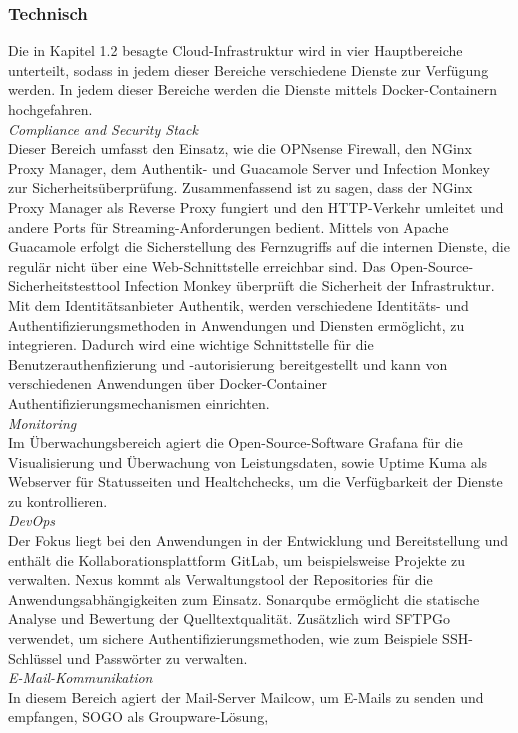 \subsubsection{Technisch}
\label{sec:Technisch}
Die in Kapitel 1.2 besagte Cloud-Infrastruktur wird in vier  
Hauptbereiche unterteilt, sodass in jedem dieser Bereiche verschiedene Dienste zur Verfügung werden. In jedem dieser Bereiche 
werden die Dienste mittels Docker-Containern hochgefahren.
\\\textit{Compliance and Security Stack}
\\Dieser Bereich umfasst den Einsatz, wie die OPNsense Firewall, den NGinx Proxy Manager, dem Authentik- und Guacamole Server 
und Infection Monkey zur Sicherheitsüberprüfung. Zusammenfassend ist zu sagen, dass der NGinx Proxy Manager als Reverse Proxy 
fungiert und den HTTP-Verkehr umleitet und andere Ports für Streaming-Anforderungen bedient. Mittels von Apache Guacamole 
erfolgt die Sicherstellung des Fernzugriffs auf die internen Dienste, die regulär nicht über eine Web-Schnittstelle erreichbar sind.
Das Open-Source-Sicherheitstesttool Infection Monkey überprüft die Sicherheit der Infrastruktur. 
Mit dem Identitätsanbieter Authentik, werden verschiedene Identitäts- und Authentifizierungsmethoden in 
Anwendungen und Diensten ermöglicht, zu integrieren. Dadurch wird eine wichtige Schnittstelle für die 
Benutzerauthenfizierung und -autorisierung bereitgestellt und kann von verschiedenen Anwendungen über 
Docker-Container Authentifizierungsmechanismen einrichten.
\\\textit{Monitoring}
\\Im Überwachungsbereich agiert die Open-Source-Software Grafana für die Visualisierung und Überwachung von Leistungsdaten, sowie 
Uptime Kuma als Webserver für Statusseiten und Healtchchecks, um die Verfügbarkeit der Dienste zu kontrollieren. 
\\\textit{DevOps}
\\Der Fokus liegt bei den Anwendungen in der Entwicklung und Bereitstellung und enthält die 
Kollaborationsplattform GitLab, um beispielsweise Projekte zu verwalten. 
Nexus kommt als Verwaltungstool der Repositories für die Anwendungsabhängigkeiten zum Einsatz. Sonarqube ermöglicht die 
statische Analyse und Bewertung der Quelltextqualität. Zusätzlich wird SFTPGo verwendet, um sichere Authentifizierungsmethoden, 
wie zum Beispiele SSH-Schlüssel und Passwörter zu verwalten.
\\\textit{E-Mail-Kommunikation}
\\In diesem Bereich agiert der Mail-Server Mailcow, um E-Mails zu senden und empfangen, SOGO als Groupware-Lösung, 

